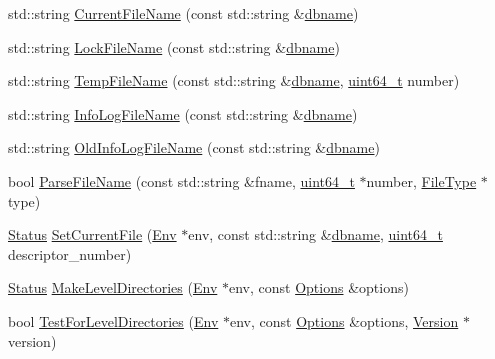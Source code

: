\begin{DoxyCompactItemize}
\item 
std\+::string \hyperlink{namespaceleveldb_affcb2d434f2a772d7c764cd5d1797a9a}{Current\+File\+Name} (const std\+::string \&\hyperlink{c__test_8c_a75d845559336df6843f3b599960f89d2}{dbname})
\item 
std\+::string \hyperlink{namespaceleveldb_a9f772d88ab2d47dec0d68e5eb85c579e}{Lock\+File\+Name} (const std\+::string \&\hyperlink{c__test_8c_a75d845559336df6843f3b599960f89d2}{dbname})
\item 
std\+::string \hyperlink{namespaceleveldb_a0563c700d6ff17e88f429464c1442da1}{Temp\+File\+Name} (const std\+::string \&\hyperlink{c__test_8c_a75d845559336df6843f3b599960f89d2}{dbname}, \hyperlink{stdint_8h_aaa5d1cd013383c889537491c3cfd9aad}{uint64\+\_\+t} number)
\item 
std\+::string \hyperlink{namespaceleveldb_ac40453ca7f9c0bd723873ffe32dc12a2}{Info\+Log\+File\+Name} (const std\+::string \&\hyperlink{c__test_8c_a75d845559336df6843f3b599960f89d2}{dbname})
\item 
std\+::string \hyperlink{namespaceleveldb_a2964797a29cbda9d37cce54109eefdc6}{Old\+Info\+Log\+File\+Name} (const std\+::string \&\hyperlink{c__test_8c_a75d845559336df6843f3b599960f89d2}{dbname})
\item 
bool \hyperlink{namespaceleveldb_af18fdbbcb483d40c35b4aaa4f00d3f6c}{Parse\+File\+Name} (const std\+::string \&fname, \hyperlink{stdint_8h_aaa5d1cd013383c889537491c3cfd9aad}{uint64\+\_\+t} $\ast$number, \hyperlink{namespaceleveldb_ab8e559ac5cadcb2b5dd531c60df944f1}{File\+Type} $\ast$type)
\item 
\hyperlink{classleveldb_1_1_status}{Status} \hyperlink{namespaceleveldb_a73133aa2e18928553d14913491b094e7}{Set\+Current\+File} (\hyperlink{classleveldb_1_1_env}{Env} $\ast$env, const std\+::string \&\hyperlink{c__test_8c_a75d845559336df6843f3b599960f89d2}{dbname}, \hyperlink{stdint_8h_aaa5d1cd013383c889537491c3cfd9aad}{uint64\+\_\+t} descriptor\+\_\+number)
\item 
\hyperlink{classleveldb_1_1_status}{Status} \hyperlink{namespaceleveldb_aa7826874de44b553174380376fe58670}{Make\+Level\+Directories} (\hyperlink{classleveldb_1_1_env}{Env} $\ast$env, const \hyperlink{structleveldb_1_1_options}{Options} \&options)
\item 
bool \hyperlink{namespaceleveldb_a8c3b8dfae0a1e98a50f73be49f020b83}{Test\+For\+Level\+Directories} (\hyperlink{classleveldb_1_1_env}{Env} $\ast$env, const \hyperlink{structleveldb_1_1_options}{Options} \&options, \hyperlink{classleveldb_1_1_version}{Version} $\ast$version)

\end{DoxyCompactItemize}
